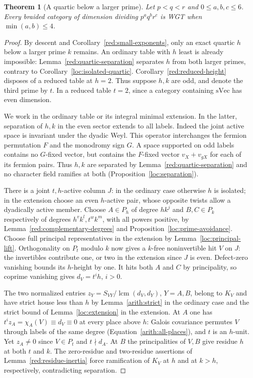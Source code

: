 \documentclass[11pt,a4paper]{article}
\numberwithin{equation}{section}
\newtheorem{theorem}{Theorem}[section]
\newcommand{\lcm}{\operatorname{lcm}}
\newcommand{\sVec}{\mathrm{sVec}}
\begin{document}
\begin{theorem}[A quartic below a larger prime]\label{red:ordered-quartic}
Let $p<q<r$ and $0\le a,b,c\le6$. Every braided category of dimension dividing
$p^a q^b r^c$ is WGT when
$\min(a,b)\le4$.
\end{theorem}
\begin{proof}
By descent and Corollary~\ref{red:small-exponents}, only an exact quartic $h$
below a larger prime $k$ remains. An ordinary table with $h$ least
is already impossible: Lemma~\ref{red:quartic-separation} separates $h$
from both larger primes, contrary to Corollary~\ref{loc:isolated-quartic}.
Corollary~\ref{red:reduced-height} disposes of a
reduced table at $h=2$. Thus suppose $h,k$ are odd, and denote the
third prime by $t$. In a reduced table $t=2$, since a category containing $\sVec$ has even dimension.

We work in the ordinary table or its integral minimal extension.
In the latter, separation of $h,k$ in the even sector extends to all
labels. Indeed the joint active space is invariant under the dyadic
Weyl. This operator interchanges the fermion permutation $F$ and the
monodromy sign $G$. A space supported on odd labels contains no
$G$-fixed vector, but contains the $F$-fixed vector $v_X+v_{gX}$
for each of its fermion pairs. Thus $h,k$ are separated by
Lemma~\ref{red:quartic-separation} and no character field ramifies at both
(Proposition~\ref{loc:separation}).

There is a joint $t,h$-active column $J$: in the ordinary case
otherwise $h$ is isolated; in the extension choose an even $h$-active
pair, whose opposite twists allow a dyadically active member.
Choose $A\in P_h$ of degree $hk^j$ and $B,C\in P_k$ respectively of
degrees $h^v k^l,t^w k^m$, with all powers positive, by Lemma~\ref{red:complementary-degrees} and Proposition~\ref{loc:prime-avoidance}. Choose full principal representatives in the extension by Lemma~\ref{loc:principal-lift}. Orthogonality on $P_t$ modulo $k$ now gives a $k$-free
noninvertible hit $V$ on $J$: the invertibles contribute one, or two
in the extension since $J$ is even. Defect-zero vanishing bounds its
$h$-height by one. It hits both $A$ and $C$ by principality, so
coprime vanishing gives $d_V=t^i h$, $i>0$.

The two normalized entries $z_Y=S_{VY}/\lcm(d_V,d_Y)$,
$Y=A,B$, belong to $K_V$ and have strict house less than $h$ by
Lemma~\ref{arith:strict} in the ordinary case and the strict bound
of Lemma~\ref{loc:extension} in the extension.
At $A$ one has $t^i z_A=\chi_A(V)\equiv d_V\equiv0$ at every place above $h$: Galois covariance permutes $V$ through labels of the same degree (Equation~\eqref{arith:all-places}), and $t$ is an $h$-unit. Yet
$z_A\ne0$ since $V\in P_t$ and $t\nmid d_A$. At $B$ the
principalities of $V,B$ give residue $h$ at both $t$ and $k$.
The zero-residue and two-residue assertions of
Lemma~\ref{red:residue-inertia} force ramification of $K_V$
at $h$ and at $k>h$, respectively, contradicting separation.
\end{proof}
\end{document}
